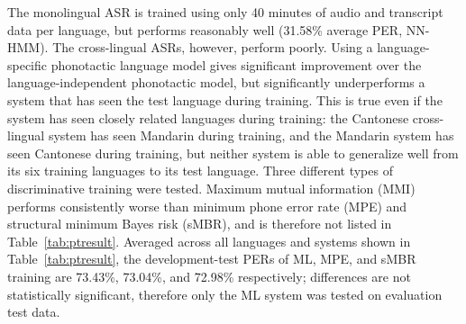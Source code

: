 The monolingual ASR is trained using only 40 minutes of audio and
transcript data per language, but performs reasonably well (31.58\%
average PER, NN-HMM).  The cross-lingual ASRs, however, perform poorly.
Using a language-specific phonotactic language model gives
significant improvement over the language-independent phonotactic
model, but significantly underperforms a system that
has seen the test language during training.  This is true
even if the system has seen closely related languages during training:
the Cantonese cross-lingual system has seen Mandarin during training,
and the Mandarin system has seen Cantonese during training, but
neither system is able to generalize well from its six training languages to
its test language.
{\color{blue} Three different types of discriminative training were tested.
 Maximum mutual information (MMI) performs consistently worse than
 minimum phone error rate (MPE) and structural minimum Bayes risk (sMBR),
 and is therefore not listed in Table~\ref{tab:ptresult}.
 Averaged across all languages and systems shown in Table~\ref{tab:ptresult},
 the development-test PERs of ML, MPE, and sMBR training are
 73.43\%, 73.04\%, and 72.98\% respectively; differences are not
 statistically significant, therefore only the ML system was tested on
 evaluation test data.}

